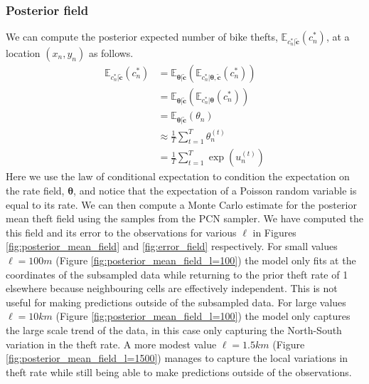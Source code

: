 \documentclass[11pt]{article}
\begin{document}
\subsubsection{Posterior field}
We can compute the posterior expected number of bike thefts, $\mathbb{E}_{c_n^*|\tilde{\boldsymbol{c}}}(c_n^*)$, at a location $(x_n, y_n)$ as follows.
\begin{equation}
    \begin{aligned}
        \mathbb{E}_{c_n^*|\tilde{\boldsymbol{c}}}(c_n^*) &= \mathbb{E}_{\boldsymbol{\theta}|\tilde{\boldsymbol{c}}}(\mathbb{E}_{c_n^*|\boldsymbol{\theta}, \tilde{\boldsymbol{c}}}(c_n^*)) \\
          &= \mathbb{E}_{\boldsymbol{\theta}|\tilde{\boldsymbol{c}}}(\mathbb{E}_{c_n^*|\boldsymbol{\theta}}(c_n^*)) \\
          &= \mathbb{E}_{\boldsymbol{\theta}|\tilde{\boldsymbol{c}}}(\theta_n) \\
          &\approx \frac{1}{T} \sum_{t=1}^{T} \theta_n^{(t)} \\
          &= \frac{1}{T} \sum_{t=1}^{T} \exp(u_n^{(t)})
    \end{aligned}
\end{equation}
Here we use the law of conditional expectation to condition the expectation on the rate field, $\boldsymbol{\theta}$, and notice that the expectation of a Poisson random variable is equal to its rate. We can then compute a Monte Carlo estimate for the posterior mean theft field using the samples from the PCN sampler. We have computed the this field and its error to the observations for various $\ell$ in Figures \ref{fig:posterior_mean_field} and \ref{fig:error_field} respectively. For small values $\ell = 100m$ (Figure \ref{fig:posterior_mean_field_l=100}) the model only fits at the coordinates of the subsampled data while returning to the prior theft rate of 1 elsewhere because neighbouring cells are effectively independent. This is not useful for making predictions outside of the subsampled data. For large values $\ell = 10km$ (Figure \ref{fig:posterior_mean_field_l=100}) the model only captures the large scale trend of the data, in this case only capturing the North-South variation in the theft rate. A more modest value $\ell = 1.5km$ (Figure \ref{fig:posterior_mean_field_l=1500}) manages to capture the local variations in theft rate while still being able to make predictions outside of the observations. 
\end{document}
